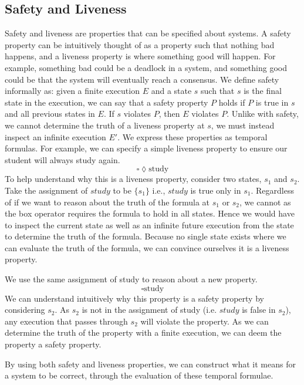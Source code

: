 \subsection{Safety and Liveness}
Safety and liveness are properties that can be specified about systems. A safety property can be intuitively thought of as a property such that nothing bad happens, and a liveness property is where something good will happen. For example, something bad could be a deadlock in a system, and something good could be that the system will eventually reach a consensus. We define safety informally as: given a finite execution $E$ and a state $s$ such that $s$ is the final state in the execution, we can say that a safety property $P$ holds if $P$ is true in $s$ and all previous states in $E$. If $s$ violates $P$, then $E$ violates $P$. Unlike with safety, we cannot determine the truth of a liveness property at $s$, we must instead inspect an infinite execution $E'$. We express these properties as temporal formulas. For example, we can specify a simple liveness property to ensure our student will always study again.
\[
\square \lozenge \text{study}
\]
To help understand why this is a liveness property, consider two states, $s_1$ and $s_2$. Take the assignment of $study$ to be $\{s_1\}$ i.e., $study$ is true only in $s_1$. Regardless of if we want to reason about the truth of the formula at $s_1$ or $s_2$, we cannot as the box operator requires the formula to hold in all states. Hence we would have to inspect the current state as well as an infinite future execution from the state to determine the truth of the formula. Because no single state exists where we can evaluate the truth of the formula, we can convince ourselves it is a liveness property.
\par
We use the same assignment of study to reason about a new property.
\[
\square \text{study}
\]
We can understand intuitively why this property is a safety property by considering $s_2$. As $s_2$ is not in the assignment of study (i.e. $study$ is false in $s_2$), any execution that passes through $s_2$ will violate the property. As we can determine the truth of the property with a finite execution, we can deem the property a safety property.
\par
By using both safety and liveness properties, we can construct what it means for a system to be correct, through the evaluation of these temporal formulae.
